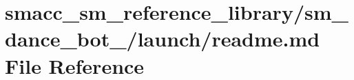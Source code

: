 \hypertarget{smacc__sm__reference__library_2sm__dance__bot__3_2launch_2readme_8md}{}\section{smacc\+\_\+sm\+\_\+reference\+\_\+library/sm\+\_\+dance\+\_\+bot\+\_/launch/readme.md File Reference}
\label{smacc__sm__reference__library_2sm__dance__bot__3_2launch_2readme_8md}
